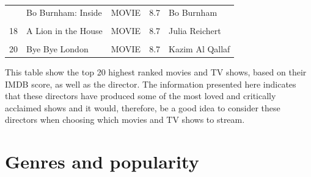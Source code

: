 \documentclass[11pt,preprint, authoryear]{elsarticle}
\let\origtable\table
\let\endorigtable\endtable
\renewenvironment{table}[1][2] {
    \expandafter\origtable\expandafter[H]
} {
    \endorigtable
}
\numberwithin{equation}{section}
\numberwithin{figure}{section}
\numberwithin{table}{section}
\begin{document}
\begin{table}
{\begin{tabular}[t]{lllrl}
\addlinespace
16 & Bo Burnham: Inside & MOVIE & 8.7 & Bo Burnham\\
\cellcolor{gray!6}{17} & \cellcolor{gray!6}{Anbe Sivam} & \cellcolor{gray!6}{MOVIE} & \cellcolor{gray!6}{8.7} & \cellcolor{gray!6}{Sundar C}\\
18 & A Lion in the House & MOVIE & 8.7 & Julia Reichert\\
\cellcolor{gray!6}{19} & \cellcolor{gray!6}{A Lion in the House} & \cellcolor{gray!6}{MOVIE} & \cellcolor{gray!6}{8.7} & \cellcolor{gray!6}{Steven Bognar}\\
20 & Bye Bye London & MOVIE & 8.7 & Kazim Al Qallaf\\
\bottomrule
\end{tabular}}
\end{table}

This table show the top 20 highest ranked movies and TV shows, based on
their IMDB score, as well as the director. The information presented
here indicates that these directors have produced some of the most loved
and critically acclaimed shows and it would, therefore, be a good idea
to consider these directors when choosing which movies and TV shows to
stream.

\hypertarget{genres-and-popularity}{%
\section{Genres and popularity}\label{genres-and-popularity}}
\end{document}
